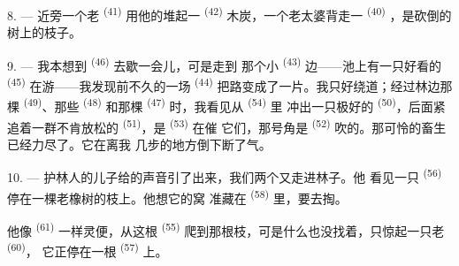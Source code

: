 8. --- 近旁一个老 \textsuperscript{(41)} 用他的堆起一
 \textsuperscript{(42)} 木炭，一个老太婆背走一 \textsuperscript{(40)}
，是砍倒的树上的枝子。

\VUsaut{3.0mm}
\VUsaut{3.0mm}

9. --- 我本想到 \textsuperscript{(46)} 去歇一会儿，可是走到
那个小 \textsuperscript{(43)} 边——池上有一只好看的
\textsuperscript{(45)} 在游——我发现前不久的一场 \textsuperscript{(44)}
把路变成了一片。我只好绕道；经过林边那棵
\textsuperscript{(49)}、那些 \textsuperscript{(48)} 和那棵
\textsuperscript{(47)} 时，我看见从 \textsuperscript{(54)} 里
冲出一只极好的 \textsuperscript{(50)}，后面紧追着一群不肯放松的
 \textsuperscript{(51)}，是 \textsuperscript{(53)} 在催
它们，那号角是 \textsuperscript{(52)} 吹的。那可怜的畜生已经力尽了。它在离我
几步的地方倒下断了气。

10. --- 护林人的儿子给的声音引了出来，我们两个又走进林子。他
看见一只 \textsuperscript{(56)} 停在一棵老橡树的枝上。他想它的窝
准藏在 \textsuperscript{(58)} 里，要去掏。

他像 \textsuperscript{(61)} 一样灵便，从这根 \textsuperscript{(55)}
爬到那根枝，可是什么也没找着，只惊起一只老 \textsuperscript{(60)}，
它正停在一根 \textsuperscript{(57)} 上。
\VUsaut{4.0mm}
\VUfilet{22mm}
